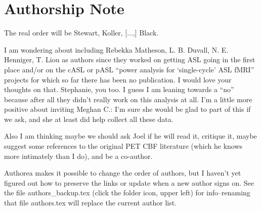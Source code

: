 \section*{Authorship Note}
The real order will be Stewart, Koller, [...,] Black.

I am wondering about including Rebekka Matheson, L. B. Duvall, N. E. Henniger, T. Liou as authors since they worked on getting ASL going in the first place and/or on the cASL or pASL ``power analysis for `single-cycle' ASL fMRI'' projects for which so far there has been no publication. I would love your thoughts on that. Stephanie, you too. I guess I am leaning towards a ``no'' because after all they didn't really work on this analysis at all. I'm a little more positive about inviting Meghan C.: I'm sure she would be glad to part of this if we ask, and she at least did help collect all these data. 

Also I am thinking maybe we should ask Joel if he will read it, critique it, maybe suggest some references to the original PET CBF literature (which he knows more intimately than I do), and be a co-author. 

Authorea makes it possible to change the order of authors, but I haven't yet figured out how to preserve the links or update when a new author signs on. See the file authors\_backup.tex (click the folder icon, upper left) for info--renaming that file authors.tex will replace the current author list.